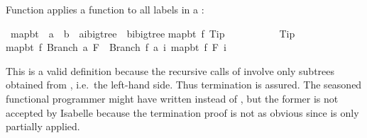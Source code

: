 \begin{isabellebody}
\begin{isamarkuptext}
Function  applies a function to all labels in a :%
\end{isamarkuptext}%
\ map{\isacharunderscore}bt\ {\isacharcolon}{\isacharcolon}\ {\isachardoublequote}{\isacharparenleft}{\isacharprime}a\ {\isasymRightarrow}\ {\isacharprime}b{\isacharparenright}\ {\isasymRightarrow}\ {\isacharparenleft}{\isacharprime}a{\isacharcomma}{\isacharprime}i{\isacharparenright}bigtree\ {\isasymRightarrow}\ {\isacharparenleft}{\isacharprime}b{\isacharcomma}{\isacharprime}i{\isacharparenright}bigtree{\isachardoublequote}\isanewline
{}\isanewline
{\isachardoublequote}map{\isacharunderscore}bt\ f\ Tip\ \ \ \ \ \ \ \ \ \ {\isacharequal}\ Tip{\isachardoublequote}\isanewline
{\isachardoublequote}map{\isacharunderscore}bt\ f\ {\isacharparenleft}Branch\ a\ F{\isacharparenright}\ {\isacharequal}\ Branch\ {\isacharparenleft}f\ a{\isacharparenright}\ {\isacharparenleft}{\isasymlambda}i{\isachardot}\ map{\isacharunderscore}bt\ f\ {\isacharparenleft}F\ i{\isacharparenright}{\isacharparenright}{\isachardoublequote}%
\begin{isamarkuptext}%
\noindent This is a valid  definition because the
recursive calls of  involve only subtrees obtained from
, i.e.\ the left-hand side. Thus termination is assured.  The
seasoned functional programmer might have written 
instead of , but the former is not accepted by
Isabelle because the termination proof is not as obvious since
 is only partially applied.


\end{isamarkuptext}
\end{isabellebody}

